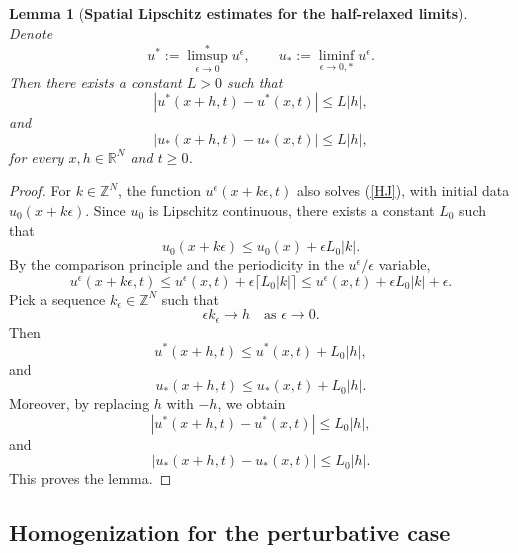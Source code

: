 \documentclass[preprint]{elsarticle}
\newtheorem{lemma}{Lemma}[section]
\numberwithin{equation}{section}
\begin{document}
\begin{lemma}[\textbf{Spatial Lipschitz estimates for the half-relaxed limits}]
 
Denote
\begin{equation*}
u^*:={\limsup}_{\epsilon\to0}^{*}u^\epsilon,
\qquad
u_*:={\liminf}_{\epsilon\to0,*}u^\epsilon.
\end{equation*}
Then there exists a constant $L>0$ such that
\begin{equation*}
|u^*(x+h,t)-u^*(x,t)|\le L|h|,
\end{equation*}
and
\begin{equation*}
|u_*(x+h,t)-u_*(x,t)|\le L|h|,
\end{equation*}
for every $x,h\in\mathbb R^N$ and $t\ge0$. \label{Lipschitz}
\end{lemma}
\begin{proof}
 For $k\in\mathbb Z^N$, the function
$
u^\epsilon(x+k\epsilon,t)
$
also solves (\ref{HJ}), with initial data
$
u_0(x+k\epsilon).
$
Since $u_0$ is Lipschitz continuous, there exists a constant $L_0$ such that
\begin{equation*}
u_0(x+k\epsilon)\le u_0(x)+\epsilon L_0|k|.
\end{equation*}
By the comparison principle and the periodicity in the $u^\epsilon/\epsilon$ variable,
\begin{equation*}
u^\epsilon(x+k\epsilon,t)
\le
u^\epsilon(x,t)+\epsilon\lceil L_0|k|\rceil
\le
u^\epsilon(x,t)+\epsilon L_0|k|+\epsilon.
\end{equation*}
Pick a sequence $k_\epsilon\in\mathbb Z^N$ such that
$$
\epsilon k_\epsilon\to h
\quad\text{as }\epsilon\to0.
$$
Then
\begin{equation*}
u^*(x+h,t)\le u^*(x,t)+L_0|h|,
\end{equation*}
and
\begin{equation*}
u_*(x+h,t)\le u_*(x,t)+L_0|h|.
\end{equation*}
Moreover, by replacing $h$ with $-h$, we obtain
\begin{equation*}
|u^*(x+h,t)-u^*(x,t)|\le L_0|h|,
\end{equation*}
and
\begin{equation*}
|u_*(x+h,t)-u_*(x,t)|\le L_0|h|.
\end{equation*}
This proves the lemma.
\end{proof}

\subsection{Homogenization for the perturbative case}
\end{document}
